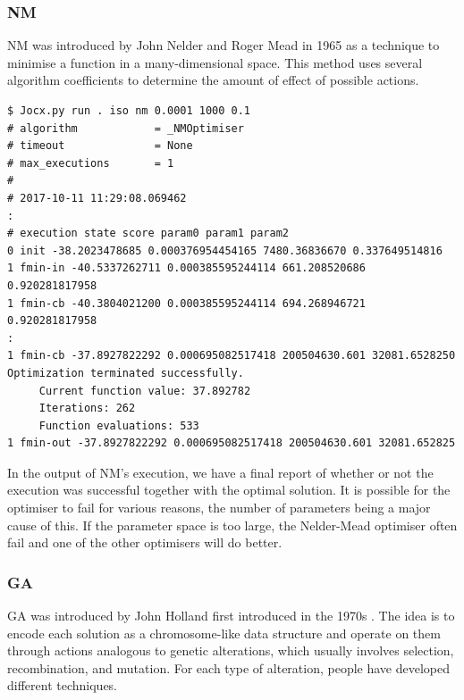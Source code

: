 \documentclass[graybox]{svmult}
\begin{document}
\subsubsection{NM}

NM was introduced by John Nelder and Roger Mead in 1965 \cite{nelder1965simplex} as a technique to minimise a function in a many-dimensional space. This method uses several algorithm coefficients to determine the amount of effect of possible actions.

 {\scriptsize{}\begin{verbatim}
$ Jocx.py run . iso nm 0.0001 1000 0.1
# algorithm            = _NMOptimiser
# timeout              = None
# max_executions       = 1
#
# 2017-10-11 11:29:08.069462
:
# execution state score param0 param1 param2
0 init -38.2023478685 0.000376954454165 7480.36836670 0.337649514816
1 fmin-in -40.5337262711 0.000385595244114 661.208520686 0.920281817958
1 fmin-cb -40.3804021200 0.000385595244114 694.268946721 0.920281817958
:
1 fmin-cb -37.8927822292 0.000695082517418 200504630.601 32081.6528250
Optimization terminated successfully.
     Current function value: 37.892782
     Iterations: 262
     Function evaluations: 533
1 fmin-out -37.8927822292 0.000695082517418 200504630.601 32081.652825
\end{verbatim}}

In the output of NM's execution, we have a final report of whether or not the execution was successful together with the optimal solution. It is possible for the optimiser to fail for various reasons, the number of parameters being a major cause of this. If the parameter space is too large, the Nelder-Mead optimiser often fail and one of the other optimisers will do better.

\subsubsection{GA}

GA was introduced by John Holland first introduced in the 1970s \cite{holland1992genetic}. The idea is to encode each solution as a chromosome-like data structure and operate on them through actions analogous to genetic alterations, which usually involves selection, recombination, and mutation. For each type of alteration, people have developed different techniques.
\end{document}
